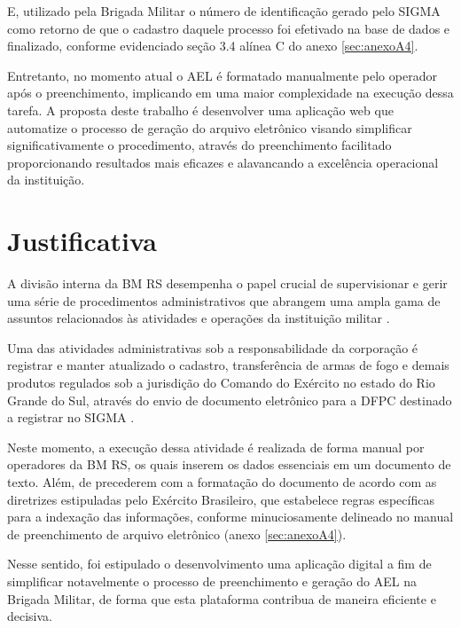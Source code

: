 E, utilizado pela Brigada Militar o número de identificação gerado pelo SIGMA como retorno de que o cadastro daquele processo foi efetivado na base de dados e finalizado, conforme evidenciado seção 3.4 alínea C do anexo \ref{sec:anexoA4}.

Entretanto, no momento atual o AEL é formatado manualmente pelo operador após o preenchimento, implicando em uma maior complexidade na execução dessa tarefa. A proposta deste trabalho é desenvolver uma aplicação web que automatize o processo de geração do arquivo eletrônico visando simplificar significativamente o procedimento, através do preenchimento facilitado proporcionando resultados mais eficazes e alavancando a excelência operacional da instituição.


\section{Justificativa}

A divisão interna da BM RS desempenha o papel crucial de supervisionar e gerir uma série de procedimentos administrativos que abrangem uma ampla gama de assuntos relacionados às atividades e operações da instituição militar \cite{bmDepartamentoAdministrativo}.

Uma das atividades administrativas sob a responsabilidade da corporação é registrar e manter atualizado o cadastro, transferência de armas de fogo e demais produtos regulados sob a jurisdição do Comando do Exército no estado do Rio Grande do Sul, através do envio de documento eletrônico para a DFPC destinado a registrar no SIGMA \cite{ExércitoBrasileiro}.

Neste momento, a execução dessa atividade é realizada de forma manual por operadores da BM RS, os quais inserem os dados essenciais em um documento de texto. Além, de precederem com a formatação do documento de acordo com as diretrizes estipuladas pelo Exército Brasileiro, que estabelece regras específicas para a indexação das informações, conforme minuciosamente delineado no manual de preenchimento de arquivo eletrônico (anexo \ref{sec:anexoA4}). 

Nesse sentido, foi estipulado o desenvolvimento uma aplicação digital a fim de simplificar notavelmente o processo de preenchimento e geração do AEL na Brigada Militar, de forma que esta plataforma contribua de maneira eficiente e decisiva.

